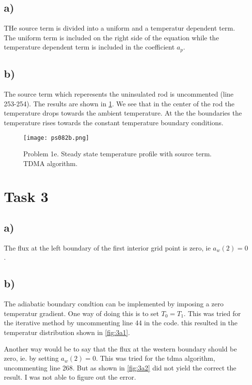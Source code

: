 \documentclass{article}
\begin{document}
\subsection{a)}
THe source term is divided into a uniform and a temperatur dependent term. The uniform term is included on the right side of the equation while the temperature dependent term is included in the coefficient $a_p$.

\subsection{b)}
The source term which reperesents the uninsulated rod is uncommented (line 253-254). The results are shown in \ref{fig:2b}. We see that in the center of the rod the temperature drops towards the ambient temperature. At the the boundaries the temperature rises towards the constant temperature boundary conditions.

\begin{figure}
\texttt{[image: ps082b.png]}
\caption{Problem 1e. Steady state temperature profile with source term. TDMA algorithm.}
\label{fig:2b}
\end{figure}

\section{Task 3}

\subsection{a)}
The flux at the left boundary of the first interior grid point is zero, ie $a_w(2) = 0$.

\subsection{b)}
The adiabatic boundary condtion can be implemented by imposing a zero temperatur gradient. One way of doing this is to set $T_0 = T_1$. This was tried for the iterative method by uncommenting line 44 in the code. this resulted in the temperatur distribution shown in \ref{fig:3a1}.

Another way would be to say that the flux at the western boundary should be zero, ie. by setting $a_w(2) = 0$. This was tried for the tdma algorithm, uncommenting line 268. But as shown in \ref{fig:3a2} did not yield the correct the result. I was not able to figure out the error.
\end{document}
